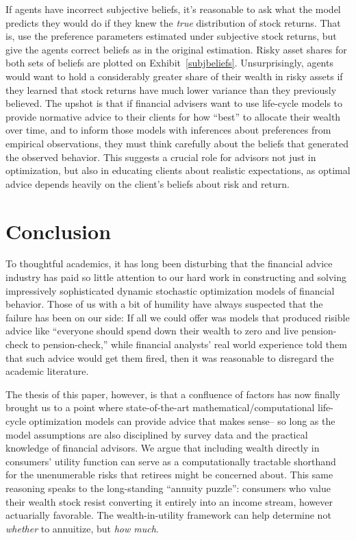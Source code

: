 \documentclass[12pt,letterpaper, fleqn]{article}
\begin{document}
If agents have incorrect subjective beliefs, it's reasonable to ask what the model predicts they would do if they knew the \textit{true} distribution of stock returns.
That is, use the preference parameters estimated under subjective stock returns, but give the agents correct beliefs as in the original estimation.
Risky asset shares for both sets of beliefs are plotted on Exhibit~\ref{subjbeliefs}.
Unsurprisingly, agents would want to hold a considerably greater share of their wealth in risky assets if they learned that stock returns have much lower variance than they previously believed.
The upshot is that if financial advisers want to use life-cycle models to provide normative advice to their clients for how ``best'' to allocate their wealth over time, and to inform those models with inferences about preferences from empirical observations, they must think carefully about the beliefs that generated the observed behavior. This suggests a crucial role for advisors not just in optimization, but also in educating clients about realistic expectations, as optimal advice depends heavily on the client's beliefs about risk and return.

\section{Conclusion}

To thoughtful academics, it has long been disturbing that the financial advice industry has paid so little attention to our hard work in constructing and solving impressively sophisticated dynamic stochastic optimization models of financial behavior.
Those of us with a bit of humility have always suspected that the failure has been on our side: If all we could offer was models that produced risible advice like ``everyone should spend down their wealth to zero and live pension-check to pension-check,'' while financial analysts' real world experience told them that such advice would get them fired, then it was reasonable to disregard the academic literature.

The thesis of this paper, however, is that a confluence of factors has now finally brought us to a point where state-of-the-art mathematical/computational life-cycle optimization models can provide advice that makes sense-- so long as the model assumptions are also disciplined by survey data and the practical knowledge of financial advisors.
We argue that including wealth directly in consumers' utility function can serve as a computationally tractable shorthand for the unenumerable risks that retirees might be concerned about.
This same reasoning speaks to the long-standing ``annuity puzzle'': consumers who value their wealth stock resist converting it entirely into an income stream, however actuarially favorable.
The wealth-in-utility framework can help determine not \textit{whether} to annuitize, but \textit{how much}.
\end{document}
